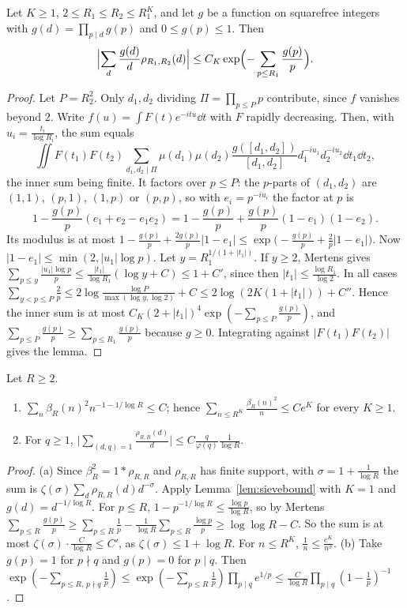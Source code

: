 \begin{lemma}\label{lem:sievebound}
Let $K\ge1$, $2\le R_1\le R_2\le R_1^K$, and let $g$ be a function on squarefree integers with $g(d)=\prod_{p\mid d}g(p)$ and $0\le g(p)\le1$. Then
\[
\Bigl|\sum_d\frac{g(d)}d\rho_{R_1,R_2}(d)\Bigr|\le C_K\exp\Bigl(-\sum_{p\le R_1}\frac{g(p)}p\Bigr).
\]
\end{lemma}
\begin{proof}
Let $P=R_2^2$. Only $d_1,d_2$ dividing $\Pi=\prod_{p\le P}p$ contribute, since $f$ vanishes beyond $2$. Write $f(u)=\int F(t)e^{-itu}\dd t$ with $F$ rapidly decreasing. Then, with $u_i=\frac{t_i}{\log R_i}$, the sum equals
\[
\iint F(t_1)F(t_2)\sum_{d_1,d_2\mid\Pi}\mu(d_1)\mu(d_2)\frac{g([d_1,d_2])}{[d_1,d_2]}d_1^{-iu_1}d_2^{-iu_2}\dd t_1\dd t_2,
\]
the inner sum being finite. It factors over $p\le P$: the $p$-parts of $(d_1,d_2)$ are $(1,1)$, $(p,1)$, $(1,p)$ or $(p,p)$, so with $e_i=p^{-iu_i}$ the factor at $p$ is
\[
1-\frac{g(p)}p(e_1+e_2-e_1e_2)=1-\frac{g(p)}p+\frac{g(p)}p(1-e_1)(1-e_2).
\]
Its modulus is at most $1-\frac{g(p)}p+\frac{2g(p)}p|1-e_1|\le\exp\bigl(-\frac{g(p)}p+\frac2p|1-e_1|\bigr)$. Now $|1-e_1|\le\min(2,|u_1|\log p)$. Let $y=R_1^{1/(1+|t_1|)}$. If $y\ge2$, Mertens gives $\sum_{p\le y}\frac{|u_1|\log p}p\le\frac{|t_1|}{\log R_1}(\log y+C)\le1+C'$, since then $|t_1|\le\frac{\log R_1}{\log2}$. In all cases $\sum_{y<p\le P}\frac2p\le2\log\frac{\log P}{\max(\log y,\log 2)}+C\le2\log(2K(1+|t_1|))+C''$. Hence the inner sum is at most $C_K(2+|t_1|)^4\exp(-\sum_{p\le P}\frac{g(p)}p)$, and $\sum_{p\le P}\frac{g(p)}p\ge\sum_{p\le R_1}\frac{g(p)}p$ because $g\ge0$. Integrating against $|F(t_1)F(t_2)|$ gives the lemma.
\end{proof}

\begin{corollary}\label{cor:sievesums}
Let $R\ge2$.
\begin{enumerate}[label=(\alph*)]
\item $\sum_n\beta_R(n)^2n^{-1-1/\log R}\le C$; hence $\sum_{n\le R^K}\frac{\beta_R(n)^2}n\le Ce^K$ for every $K\ge1$.
\item For $q\ge1$, $\bigl|\sum_{(d,q)=1}\frac{\rho_{R,R}(d)}d\bigr|\le C\frac q{\varphi(q)}\frac1{\log R}$.
\end{enumerate}
\end{corollary}
\begin{proof}
(a) Since $\beta_R^2=1*\rho_{R,R}$ and $\rho_{R,R}$ has finite support, with $\sigma=1+\frac1{\log R}$ the sum is $\zeta(\sigma)\sum_d\rho_{R,R}(d)d^{-\sigma}$. Apply Lemma~\ref{lem:sievebound} with $K=1$ and $g(d)=d^{-1/\log R}$. For $p\le R$, $1-p^{-1/\log R}\le\frac{\log p}{\log R}$, so by Mertens $\sum_{p\le R}\frac{g(p)}p\ge\sum_{p\le R}\frac1p-\frac1{\log R}\sum_{p\le R}\frac{\log p}p\ge\log\log R-C$. So the sum is at most $\zeta(\sigma)\cdot\frac C{\log R}\le C'$, as $\zeta(\sigma)\le1+\log R$. For $n\le R^K$, $\frac1n\le\frac{e^K}{n^\sigma}$.
(b) Take $g(p)=1$ for $p\nmid q$ and $g(p)=0$ for $p\mid q$. Then $\exp(-\sum_{p\le R,\,p\nmid q}\frac1p)\le\exp(-\sum_{p\le R}\frac1p)\prod_{p\mid q}e^{1/p}\le\frac C{\log R}\prod_{p\mid q}(1-\frac1p)^{-1}$.
\end{proof}

